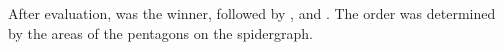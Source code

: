 \documentclass[a4paper]{artikel3}
\begin{document}
After evaluation, \jqma{} was the winner,  followed by \kendob{}, \lungo{} and \sta{}.
The order was determined by the areas of the pentagons on the spidergraph.




%


\end{document}
